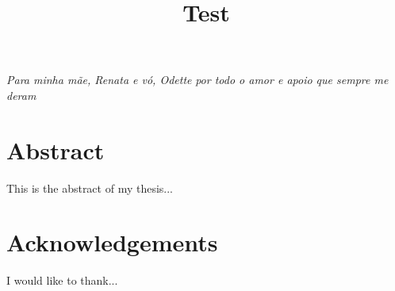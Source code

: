 \documentclass[12pt, a4paper]{report}
\title{Test}
\begin{document}

\setcounter{page}{1}

\maketitle


\cleardoublepage
\thispagestyle{empty}
\vspace*{\fill}
\begin{raggedright}
	\textit{Para minha mãe, Renata e vó, Odette}
	\textit{por todo o amor e apoio que sempre me deram}
\end{raggedright}
\vspace*{2cm}

\chapter*{Abstract}
This is the abstract of my thesis...

\newpage

\chapter*{Acknowledgements}
I would like to thank...

\newpage

\tableofcontents

\newpage

\listoffigures
{}

\newpage

\listoftables
{}

\clearpage
{}
\setcounter{page}{1}


















\clearpage
\printbibliography[heading=bibintoc, title={References}]
\end{document}
